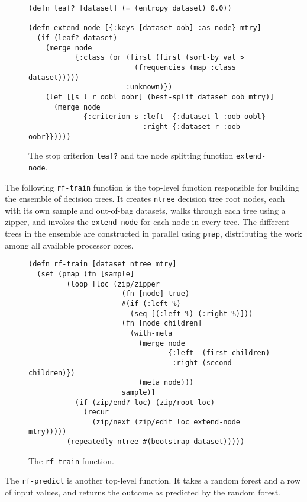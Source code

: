 \documentclass[a4paper,man,12pt,apacite,floatsintext,draftfirst]{apa6} %
\begin{document}
\begin{figure}[H]
\caption{The stop criterion \texttt{leaf?} and the node splitting function \texttt{extend-node}.}
\begin{verbatim}
(defn leaf? [dataset] (= (entropy dataset) 0.0))

(defn extend-node [{:keys [dataset oob] :as node} mtry]
  (if (leaf? dataset)
    (merge node
           {:class (or (first (first (sort-by val >
                         (frequencies (map :class dataset)))))
                       :unknown)})
    (let [[s l r oobl oobr] (best-split dataset oob mtry)]
      (merge node
             {:criterion s :left  {:dataset l :oob oobl}
                           :right {:dataset r :oob oobr}}))))
\end{verbatim}
\end{figure}

The following \texttt{rf-train} function is the top-level function responsible for
building the ensemble of decision trees.
It creates \texttt{ntree} decision tree root nodes, each with its own sample
and out-of-bag datasets, walks through each tree using a zipper,
and invokes the \texttt{extend-node} for each node in every tree.
The different trees in the ensemble are constructed in parallel using \texttt{pmap},
distributing the work among all available processor cores.

\begin{figure}[H]
\caption{The \texttt{rf-train} function.}
\begin{verbatim}
(defn rf-train [dataset ntree mtry]
  (set (pmap (fn [sample]
         (loop [loc (zip/zipper
                      (fn [node] true)
                      #(if (:left %)
                        (seq [(:left %) (:right %)]))
                      (fn [node children]
                        (with-meta
                          (merge node
                                 {:left  (first children)
                                  :right (second children)})
                          (meta node)))
                      sample)]
           (if (zip/end? loc) (zip/root loc)
             (recur
               (zip/next (zip/edit loc extend-node mtry)))))
         (repeatedly ntree #(bootstrap dataset)))))
\end{verbatim}
\end{figure}

The \texttt{rf-predict} is another top-level function.
It takes a random forest and a row of input values, and returns the outcome as
predicted by the random forest.
\end{document}

